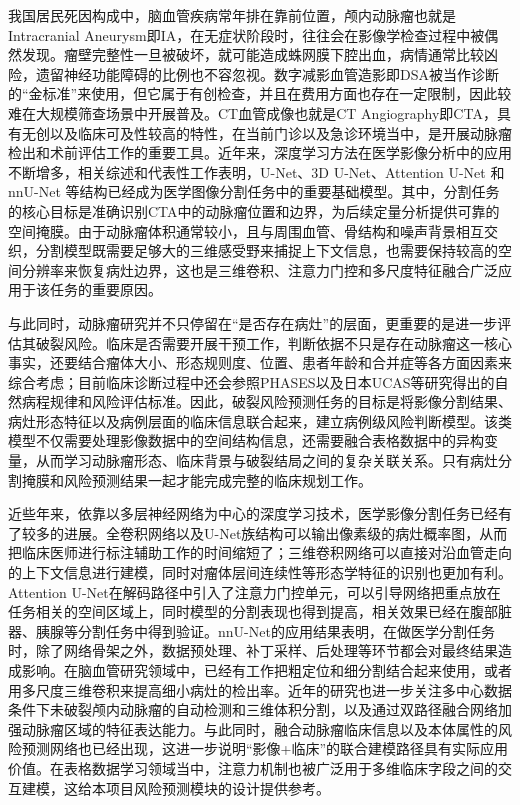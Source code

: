 

我国居民死因构成中，脑血管疾病常年排在靠前位置，颅内动脉瘤也就是Intracranial Aneurysm即IA，在无症状阶段时，往往会在影像学检查过程中被偶然发现。瘤壁完整性一旦被破坏，就可能造成蛛网膜下腔出血，病情通常比较凶险，遗留神经功能障碍的比例也不容忽视。数字减影血管造影即DSA被当作诊断的“金标准”来使用，但它属于有创检查，并且在费用方面也存在一定限制，因此较难在大规模筛查场景中开展普及。CT血管成像也就是CT Angiography即CTA，具有无创以及临床可及性较高的特性，在当前门诊以及急诊环境当中，是开展动脉瘤检出和术前评估工作的重要工具\cite{li2018coarse,chen2022coarse}。近年来，深度学习方法在医学影像分析中的应用不断增多，相关综述和代表性工作表明，U-Net、3D U-Net、Attention U-Net 和 nnU-Net 等结构已经成为医学图像分割任务中的重要基础模型\cite{litjens2017survey,shen2017deep,unet,unet3d,attention_unet,nnunet}。其中，分割任务的核心目标是准确识别CTA中的动脉瘤位置和边界，为后续定量分析提供可靠的空间掩膜。由于动脉瘤体积通常较小，且与周围血管、骨结构和噪声背景相互交织，分割模型既需要足够大的三维感受野来捕捉上下文信息，也需要保持较高的空间分辨率来恢复病灶边界，这也是三维卷积、注意力门控和多尺度特征融合广泛应用于该任务的重要原因。

与此同时，动脉瘤研究并不只停留在“是否存在病灶”的层面，更重要的是进一步评估其破裂风险。临床是否需要开展干预工作，判断依据不只是存在动脉瘤这一核心事实，还要结合瘤体大小、形态规则度、位置、患者年龄和合并症等各方面因素来综合考虑；目前临床诊断过程中还会参照PHASES以及日本UCAS等研究得出的自然病程规律和风险评估标准\cite{greving2014,morita2012}。因此，破裂风险预测任务的目标是将影像分割结果、病灶形态特征以及病例层面的临床信息联合起来，建立病例级风险判断模型。该类模型不仅需要处理影像数据中的空间结构信息，还需要融合表格数据中的异构变量，从而学习动脉瘤形态、临床背景与破裂结局之间的复杂关联关系。只有病灶分割掩膜和风险预测结果一起才能完成完整的临床规划工作。

近些年来，依靠以多层神经网络为中心的深度学习技术，医学影像分割任务已经有了较多的进展。全卷积网络以及U-Net族结构可以输出像素级的病灶概率图，从而把临床医师进行标注辅助工作的时间缩短了\cite{unet,long2015}；三维卷积网络可以直接对沿血管走向的上下文信息进行建模，同时对瘤体层间连续性等形态学特征的识别也更加有利\cite{unet3d,milletari2016}。Attention U-Net在解码路径中引入了注意力门控单元，可以引导网络把重点放在任务相关的空间区域上，同时模型的分割表现也得到提高，相关效果已经在腹部脏器、胰腺等分割任务中得到验证\cite{attention_unet}。nnU-Net的应用结果表明，在做医学分割任务时，除了网络骨架之外，数据预处理、补丁采样、后处理等环节都会对最终结果造成影响\cite{nnunet}。在脑血管研究领域中，已经有工作把粗定位和细分割结合起来使用，或者用多尺度三维卷积来提高细小病灶的检出率\cite{kamnitsas2017,li2018coarse,chen2022coarse}。近年的研究也进一步关注多中心数据条件下未破裂颅内动脉瘤的自动检测和三维体积分割，以及通过双路径融合网络加强动脉瘤区域的特征表达能力\cite{indrakanti2025multicentric,wang2025dualpath}。与此同时，融合动脉瘤临床信息以及本体属性的风险预测网络也已经出现，这进一步说明“影像+临床”的联合建模路径具有实际应用价值\cite{strokenet,xiong2025}。在表格数据学习领域当中，注意力机制也被广泛用于多维临床字段之间的交互建模，这给本项目风险预测模块的设计提供参考。

